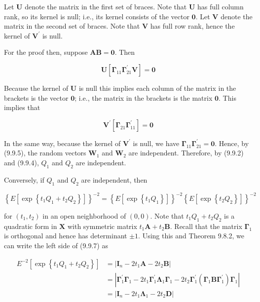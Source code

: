 Let $\mathbf{U}$ denote the matrix in the first set of braces. Note that $\mathbf{U}$ has full column rank, so its kernel is null; i.e., its kernel consists of the vector $\mathbf{0}$. Let $\mathbf{V}$ denote the matrix in the second set of braces. Note that $\mathbf{V}$ has full row rank, hence the kernel of $\mathbf{V}^{\prime}$ is null.

For the proof then, suppose $\mathbf{A B}=\mathbf{0}$. Then

$$
\mathbf{U}\left[\boldsymbol{\Gamma}_{11} \boldsymbol{\Gamma}_{21}^{\prime} \mathbf{V}\right]=\mathbf{0}
$$

Because the kernel of $\mathbf{U}$ is null this implies each column of the matrix in the brackets is the vector $\mathbf{0}$; i.e., the matrix in the brackets is the matrix $\mathbf{0}$. This implies that

$$
\mathbf{V}^{\prime}\left[\boldsymbol{\Gamma}_{21} \boldsymbol{\Gamma}_{11}^{\prime}\right]=\mathbf{0}
$$

In the same way, because the kernel of $\mathbf{V}^{\prime}$ is null, we have $\boldsymbol{\Gamma}_{11} \boldsymbol{\Gamma}_{21}^{\prime}=\mathbf{0}$. Hence, by (9.9.5), the random vectors $\mathbf{W}_{1}$ and $\mathbf{W}_{2}$ are independent. Therefore, by (9.9.2) and (9.9.4), $Q_{1}$ and $Q_{2}$ are independent.

Conversely, if $Q_{1}$ and $Q_{2}$ are independent, then


\begin{equation*}
\left\{E\left[\exp \left\{t_{1} Q_{1}+t_{2} Q_{2}\right\}\right]\right\}^{-2}=\left\{E\left[\exp \left\{t_{1} Q_{1}\right\}\right]\right\}^{-2}\left\{E\left[\exp \left\{t_{2} Q_{2}\right\}\right]\right\}^{-2} \tag{9.9.7}
\end{equation*}


for $\left(t_{1}, t_{2}\right)$ in an open neighborhood of $(0,0)$. Note that $t_{1} Q_{1}+t_{2} Q_{2}$ is a quadratic form in $\mathbf{X}$ with symmetric matrix $t_{1} \mathbf{A}+t_{2} \mathbf{B}$. Recall that the matrix $\boldsymbol{\Gamma}_{1}$ is orthogonal and hence has determinant $\pm 1$. Using this and Theorem 9.8.2, we can write the left side of (9.9.7) as


\begin{align*}
E^{-2}\left[\exp \left\{t_{1} Q_{1}+t_{2} Q_{2}\right\}\right] & =\left|\mathbf{I}_{n}-2 t_{1} \mathbf{A}-2 t_{2} \mathbf{B}\right| \\
& =\left|\boldsymbol{\Gamma}_{1}^{\prime} \boldsymbol{\Gamma}_{1}-2 t_{1} \boldsymbol{\Gamma}_{1}^{\prime} \boldsymbol{\Lambda}_{1} \boldsymbol{\Gamma}_{1}-2 t_{2} \boldsymbol{\Gamma}_{1}^{\prime}\left(\boldsymbol{\Gamma}_{1} \mathbf{B} \boldsymbol{\Gamma}_{1}^{\prime}\right) \boldsymbol{\Gamma}_{1}\right| \\
& =\left|\mathbf{I}_{n}-2 t_{1} \boldsymbol{\Lambda}_{1}-2 t_{2} \mathbf{D}\right| \tag{9.9.8}
\end{align*}


